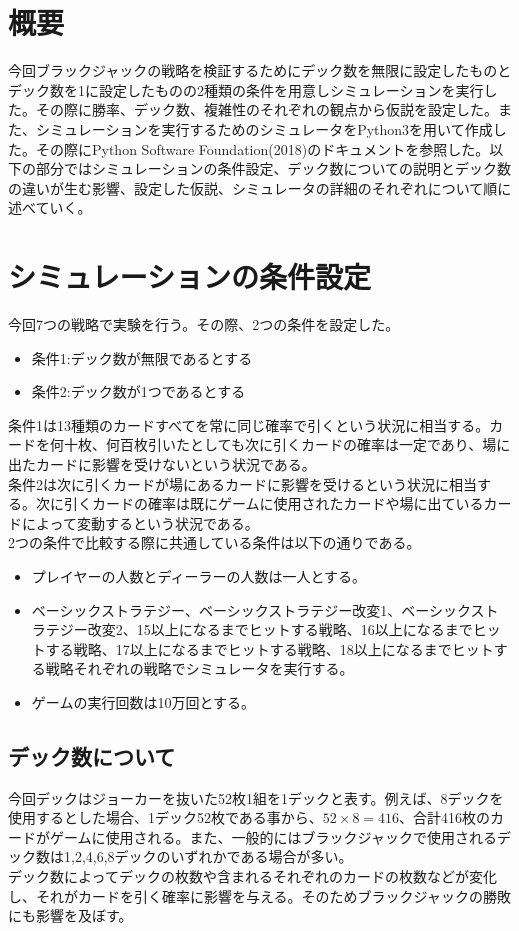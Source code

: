 \section{概要}
今回ブラックジャックの戦略を検証するためにデック数を無限に設定したものとデック数を1に設定したものの2種類の条件を用意しシミュレーションを実行した。その際に勝率、デック数、複雑性のそれぞれの観点から仮説を設定した。また、シミュレーションを実行するためのシミュレータをPython3を用いて作成した。その際にPython Software Foundation(2018)のドキュメントを参照した。以下の部分ではシミュレーションの条件設定、デック数についての説明とデック数の違いが生む影響、設定した仮説、シミュレータの詳細のそれぞれについて順に述べていく。

\section{シミュレーションの条件設定}
今回7つの戦略で実験を行う。その際、2つの条件を設定した。
\begin{itemize}
\item 条件1:デック数が無限であるとする
\item 条件2:デック数が1つであるとする
\end{itemize}
条件1は13種類のカードすべてを常に同じ確率で引くという状況に相当する。カードを何十枚、何百枚引いたとしても次に引くカードの確率は一定であり、場に出たカードに影響を受けないという状況である。\\
条件2は次に引くカードが場にあるカードに影響を受けるという状況に相当する。次に引くカードの確率は既にゲームに使用されたカードや場に出ているカードによって変動するという状況である。\\
2つの条件で比較する際に共通している条件は以下の通りである。
\begin{itemize}
\item プレイヤーの人数とディーラーの人数は一人とする。
\item ベーシックストラテジー、ベーシックストラテジー改変1、ベーシックストラテジー改変2、15以上になるまでヒットする戦略、16以上になるまでヒットする戦略、17以上になるまでヒットする戦略、18以上になるまでヒットする戦略それぞれの戦略でシミュレータを実行する。
\item ゲームの実行回数は10万回とする。
\end{itemize}

\subsection{デック数について}
今回デックはジョーカーを抜いた52枚1組を1デックと表す。例えば、8デックを使用するとした場合、1デック52枚である事から、$52×8=416$、合計416枚のカードがゲームに使用される。また、一般的にはブラックジャックで使用されるデック数は1,2,4,6,8デックのいずれかである場合が多い。\\
デック数によってデックの枚数や含まれるそれぞれのカードの枚数などが変化し、それがカードを引く確率に影響を与える。そのためブラックジャックの勝敗にも影響を及ぼす。

